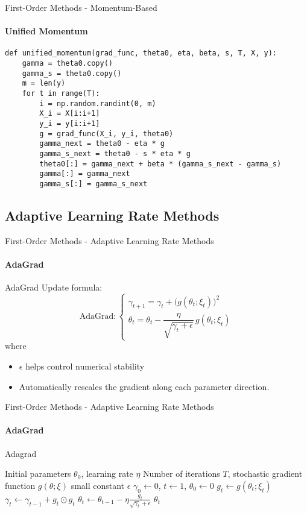 \documentclass{beamer}
\begin{document}
\begin{frame}[fragile]{First-Order Methods - Momentum-Based}
\framesubtitle{Unified Momentum}
\begin{verbatim}
def unified_momentum(grad_func, theta0, eta, beta, s, T, X, y):
    gamma = theta0.copy()
    gamma_s = theta0.copy()
    m = len(y)
    for t in range(T):
        i = np.random.randint(0, m)
        X_i = X[i:i+1]
        y_i = y[i:i+1]
        g = grad_func(X_i, y_i, theta0)
        gamma_next = theta0 - eta * g
        gamma_s_next = theta0 - s * eta * g
        theta0[:] = gamma_next + beta * (gamma_s_next - gamma_s)
        gamma[:] = gamma_next
        gamma_s[:] = gamma_s_next

\end{verbatim}
\end{frame}

\subsection{Adaptive Learning Rate Methods}
\begin{frame}[fragile]{First-Order Methods - Adaptive Learning Rate Methods}
\framesubtitle{AdaGrad}
\begin{block}{AdaGrad}
Update formula:
\[
\text{AdaGrad}:\begin{cases}
\gamma_{t+1} = \gamma_{t} + \big(g(\theta_{t}; \xi_t)\big)^2 \\
\theta_{t} = \theta_{t} - \dfrac{\eta}{\sqrt{\gamma_{t}+\epsilon} }\, g(\theta_{t}; \xi_t)
\end{cases}
\]
where
\begin{itemize}
    \item $\epsilon$ helps control numerical stability
\end{itemize}

\end{block}
\begin{itemize}
    \item Automatically rescales the gradient along each parameter direction. 
\end{itemize}
\end{frame}
\begin{frame}[fragile]{First-Order Methods - Adaptive Learning Rate Methods}
\framesubtitle{AdaGrad}
\small
\begin{algorithm}[H]
\caption{Adagrad}
\begin{algorithmic}[1]
\Require Initial parameters $\theta_0$, learning rate $\eta$
\Require Number of iterations $T$, stochastic gradient function $g(\theta;\xi)$
\Require small constant $\epsilon$
\State $\gamma_0 \gets 0$, $t \gets 1$, $\theta_0 \gets0$  
    \State $g_t \gets g(\theta_t; \xi_t)$ 
    \State $\gamma_{t} \gets \gamma_{t-1} + g_t \odot g_t$ 
    \State $\theta_{t} \gets \theta_{t-1} - \eta \frac{g_t}{\sqrt{\gamma_t} + \epsilon}$ 
\EndWhile
\State \Return $\theta_t$
\end{algorithmic}
\end{algorithm}
\end{frame}
\end{document}
